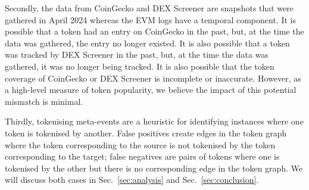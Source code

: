 Secondly, the data from CoinGecko and DEX Screener are snapshots that
were gathered in April 2024 whereas the EVM logs have a temporal
component.  It is possible that a token had an entry on CoinGecko in
the past, but, at the time the data was gathered, the entry no longer
existed.  It is also possible that a token was tracked by DEX Screener
in the past, but, at the time the data was gathered, it was no longer
being tracked.  It is also possible that the token coverage of
CoinGecko or DEX Screener is incomplete or inaccurate.  However, as a
high-level measure of token popularity, we believe the impact of this
potential mismatch is minimal.

Thirdly, tokenising meta-events are a heuristic for identifying
instances where one token is tokenised by another.  False positives
create edges in the token graph where the token corresponding to the
source is not tokenised by the token corresponding to the target;
false negatives are pairs of tokens where one is tokenised by the
other but there is no corresponding edge in the token graph.  We will
discuss both cases in Sec.~\ref{sec:analysis} and
Sec.~\ref{sec:conclusion}.
